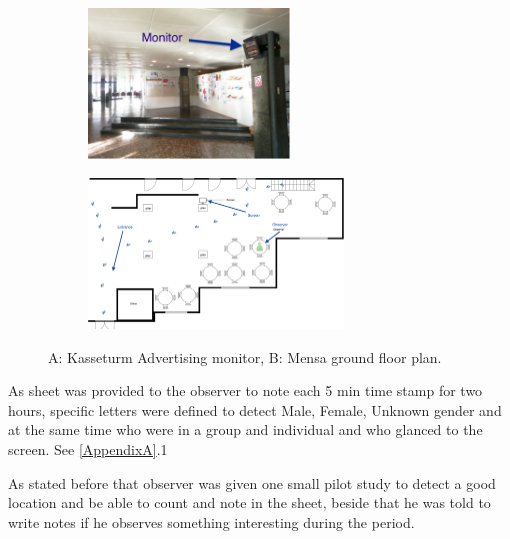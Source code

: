 \begin{figure}[H]
    \centering
    \begin{subfigure}[H]{0.45\textwidth}
        \centering
        \includegraphics[width=\textwidth,height=4cm]{Figures/3/Kasseturm_monitor}
        \caption{}
        \label{fig:kasseturm}
    \end{subfigure}
    \hfill
    \begin{subfigure}[H]{0.45\textwidth}
        \centering
        \includegraphics[width=\textwidth,height=4cm]{Figures/3/mensa_setup}
        \caption{}
        \label{fig:mensasetup}
    \end{subfigure}
    \caption{A: Kasseturm Advertising monitor,  B: Mensa ground floor plan. }
    \label{fig:observation_env}
\end{figure}


As sheet was provided to the observer to note each 5 min time stamp for two hours, specific letters were defined to detect Male, Female, Unknown gender and at the same time who were in a group and individual and who glanced to the screen. See \ref{AppendixA}.1

As stated before that observer was given one small pilot study to detect a good location and be able to count and note in the sheet, beside that he was told to write notes if he observes something interesting during the period.


